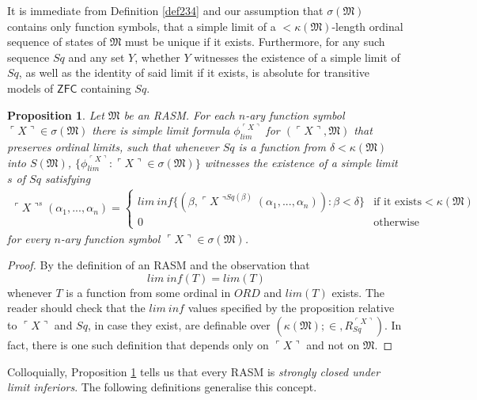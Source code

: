 \documentclass[12pt, twoside]{memoir}
\numberwithin{equation}{section}
\newtheorem{prop}[thm]{Proposition}
\theoremstyle{definition}
\theoremstyle{remark}
\theoremstyle{definition}
\theoremstyle{definition}
\theoremstyle{definition}
\theoremstyle{remark}
\begin{document}
It is immediate from Definition \ref{def234} and our assumption that $\sigma(\mathfrak{M})$ contains only function symbols, that a simple limit of a $< \kappa(\mathfrak{M})$-length ordinal sequence of states of $\mathfrak{M}$ must be unique if it exists. Furthermore, for any such sequence $Sq$ and any set $Y$, whether $Y$ witnesses the existence of a simple limit of $Sq$, as well as the identity of said limit if it exists, is absolute for transitive models of $\mathsf{ZFC}$ containing $Sq$.

\begin{prop}\label{prop233}
Let $\mathfrak{M}$ be an RASM. For each $n$-ary function symbol $\ulcorner X \urcorner \in \sigma(\mathfrak{M})$ there is simple limit formula $\phi_{lim}^{\ulcorner X \urcorner}$ for $(\ulcorner X \urcorner, \mathfrak{M})$ that preserves ordinal limits, such that whenever $Sq$ is a function from $\delta < \kappa(\mathfrak{M})$ into $S(\mathfrak{M})$, $\{\phi_{lim}^{\ulcorner X \urcorner} : \ulcorner X \urcorner \in \sigma(\mathfrak{M})\}$ witnesses the existence of a simple limit $s$ of $Sq$ satisfying 
\begin{gather*}
    \ulcorner X \urcorner^{s} (\alpha_1, ..., \alpha_n) = 
    \begin{cases}
        lim \ inf \{(\beta, \ulcorner X \urcorner^{Sq(\beta)}(\alpha_1, ..., \alpha_n)) : \beta < \delta\} & \!\!\!\! \text{if it exists} < \kappa(\mathfrak{M}) \\
        0 & \!\!\!\! \text{otherwise}
    \end{cases} 
\end{gather*}
for every $n$-ary function symbol $\ulcorner X \urcorner \in \sigma(\mathfrak{M})$.
\end{prop}

\begin{proof}
By the definition of an RASM and the observation that 
\begin{equation*}
    lim \ inf (T) = lim (T)
\end{equation*}
whenever $T$ is a function from some ordinal in $ORD$ and $lim (T)$ exists. The reader should check that the $lim \ inf$ values specified by the proposition relative to $\ulcorner X \urcorner$ and $Sq$, in case they exist, are definable over $(\kappa(\mathfrak{M}); \in, R_{Sq}^{\ulcorner X \urcorner})$. In fact, there is one such definition that depends only on $\ulcorner X \urcorner$ and not on $\mathfrak{M}$.
\end{proof}

Colloquially, Proposition \ref{prop233} tells us that every RASM is \emph{strongly closed under limit inferiors}. The following definitions generalise this concept.
\end{document}
